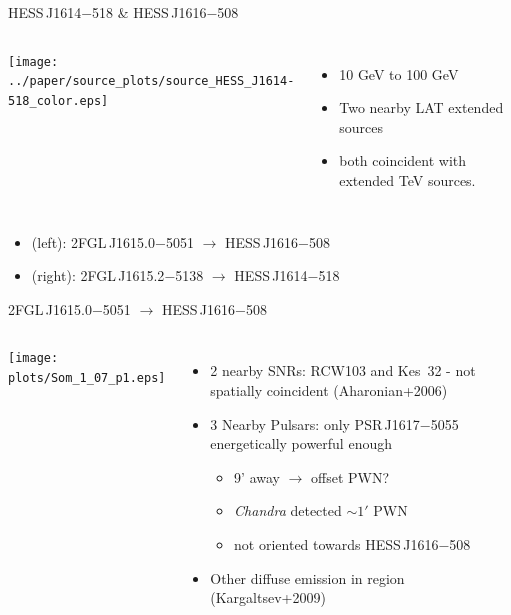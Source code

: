\documentclass[12pt]{beamer}
\begin{document}
\begin{frame}{HESS\,J1614$-$518 \& HESS\,J1616$-$508}
  \begin{columns}
    \texttt{[image: ../paper/source\_plots/source\_HESS\_J1614-518\_color.eps]}
    \begin{itemize}
      \item 10 GeV to 100 GeV
      \item Two nearby LAT extended sources 
      \item both
        coincident with extended TeV sources.
    \end{itemize}
  \end{columns}

  \begin{itemize}
    \item (left): 
      2FGL\,J1615.0$-$5051 $\rightarrow$ HESS\,J1616$-$508
    \item (right):
      2FGL\,J1615.2$-$5138 $\rightarrow$ HESS\,J1614$-$518
  \end{itemize}

\end{frame}


\begin{frame}{2FGL\,J1615.0$-$5051 $\rightarrow$ HESS\,J1616$-$508}
  \begin{columns}
  \texttt{[image: plots/Som\_1\_07\_p1.eps]}
  \begin{itemize}
    \item 2 nearby SNRs: RCW103 and Kes~32 - not spatially coincident (Aharonian+2006) 
    \item 3 Nearby Pulsars: only 
      PSR\,J1617$-$5055 energetically powerful enough
      \begin{itemize}
        \item 9' away $\rightarrow$ offset PWN?
        \item {\em Chandra} detected $\sim 1'$ PWN 
        \item not oriented towards HESS\,J1616$-$508
        \end{itemize}
      \item Other diffuse emission in region (Kargaltsev+2009)
    \end{itemize}
  \end{columns}
\end{frame}
\end{document}
